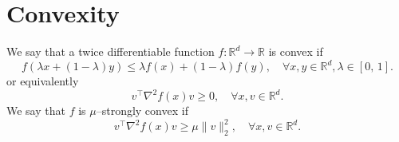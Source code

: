 \documentclass[11pt]{article}
\newcommand{\R}{\mathbb{R}}
\newcommand{\norm}[1]{\lVert#1\rVert}
\begin{document}
  \section{Convexity}
We say that a twice differentiable function $f: \R^d \rightarrow \R$ is convex if 
\begin{equation} \label{eq:convoriginal}
f(\lambda x+(1-\lambda)y) \leq \lambda f(x) + (1-\lambda)f(y), \quad \forall x,y \in \R^d, \lambda \in [0,\,1].
\end{equation}
or equivalently
\begin{equation} \label{eq:convhess}
v^\top \nabla^2 f(x) v \geq 0, \quad \forall x,v \in \R^d.
\end{equation}
We say that $f$ is $\mu$--strongly convex if
\begin{equation} \label{eq:strconvhess}
v^\top \nabla^2 f(x) v \geq \mu \norm{v}_2^2, \quad \forall x,v \in \R^d.
\end{equation}
\vspace{0.5cm}  
\end{document}
